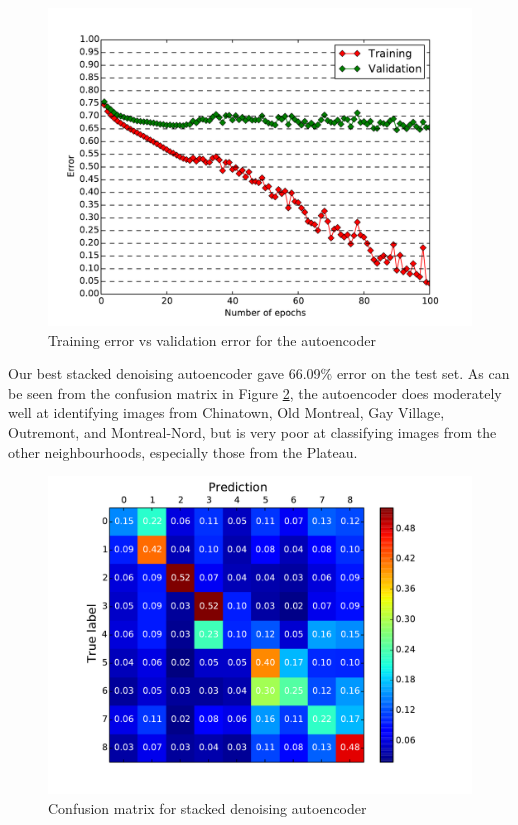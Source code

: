 \documentclass{acm_proc_article-sp}
\begin{document}
\begin{figure}[h!]
\includegraphics[width=\linewidth]{autoencoder_learning.pdf}
		\caption{Training error vs validation error for the autoencoder}
		\label{fig:autoencoder_trainvsvalid}
\end{figure}

Our best stacked denoising autoencoder gave 66.09\% error on the test set. As can be seen from the confusion matrix in Figure \ref{fig:autoencoder_conf}, the autoencoder does moderately well at identifying images from Chinatown, Old Montreal, Gay Village, Outremont, and Montreal-Nord, but is very poor at classifying images from the other neighbourhoods, especially those from the Plateau.

\begin{figure}[h!]
\includegraphics[width=\linewidth]{autoencoder_confusion.pdf}
		\caption{Confusion matrix for stacked denoising autoencoder}
		\label{fig:autoencoder_conf}
\end{figure}
\end{document}
